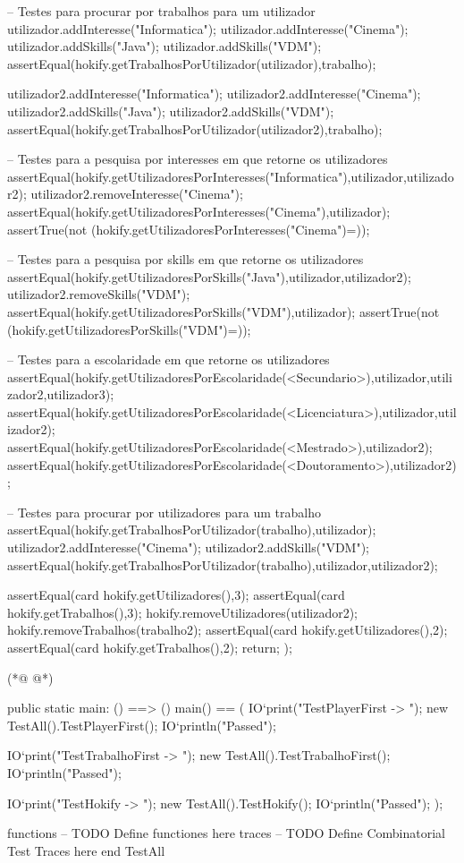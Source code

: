 \begin{vdmpp}[breaklines=true]
 -- Testes para procurar por trabalhos para um utilizador
 utilizador.addInteresse("Informatica");
 utilizador.addInteresse("Cinema");
 utilizador.addSkills("Java");
 utilizador.addSkills("VDM");
 assertEqual(hokify.getTrabalhosPorUtilizador(utilizador),{trabalho});
 
 utilizador2.addInteresse("Informatica");
 utilizador2.addInteresse("Cinema");
 utilizador2.addSkills("Java");
 utilizador2.addSkills("VDM");
 assertEqual(hokify.getTrabalhosPorUtilizador(utilizador2),{trabalho});
 
 -- Testes para a pesquisa por interesses em que retorne os utilizadores
 assertEqual(hokify.getUtilizadoresPorInteresses("Informatica"),{utilizador,utilizador2});
 utilizador2.removeInteresse("Cinema");
 assertEqual(hokify.getUtilizadoresPorInteresses("Cinema"),{utilizador});
 assertTrue(not (hokify.getUtilizadoresPorInteresses("Cinema")={}));
 
 -- Testes para a pesquisa por skills em que retorne os utilizadores
 assertEqual(hokify.getUtilizadoresPorSkills("Java"),{utilizador,utilizador2});
 utilizador2.removeSkills("VDM");
 assertEqual(hokify.getUtilizadoresPorSkills("VDM"),{utilizador});
 assertTrue(not (hokify.getUtilizadoresPorSkills("VDM")={}));
 
 -- Testes para a escolaridade em que retorne os utilizadores
 assertEqual(hokify.getUtilizadoresPorEscolaridade(<Secundario>),{utilizador,utilizador2,utilizador3});
 assertEqual(hokify.getUtilizadoresPorEscolaridade(<Licenciatura>),{utilizador,utilizador2});
 assertEqual(hokify.getUtilizadoresPorEscolaridade(<Mestrado>),{utilizador2});
 assertEqual(hokify.getUtilizadoresPorEscolaridade(<Doutoramento>),{utilizador2});
 
 -- Testes para procurar por utilizadores para um trabalho
 assertEqual(hokify.getTrabalhosPorUtilizador(trabalho),{utilizador});
 utilizador2.addInteresse("Cinema");
 utilizador2.addSkills("VDM");
 assertEqual(hokify.getTrabalhosPorUtilizador(trabalho),{utilizador,utilizador2});
 
 assertEqual(card hokify.getUtilizadores(),3);
 assertEqual(card hokify.getTrabalhos(),3);
 hokify.removeUtilizadores(utilizador2);
 hokify.removeTrabalhos(trabalho2);
 assertEqual(card hokify.getUtilizadores(),2);
 assertEqual(card hokify.getTrabalhos(),2);
 return;
);

(*@
\label{main:215}
@*)

public static main: () ==> ()
main() ==
(
 IO`print("TestPlayerFirst -> ");
 new TestAll().TestPlayerFirst();
 IO`println("Passed");
 
 IO`print("TestTrabalhoFirst -> ");
 new TestAll().TestTrabalhoFirst();
 IO`println("Passed");
 
 IO`print("TestHokify -> ");
 new TestAll().TestHokify();
 IO`println("Passed");
);

functions
-- TODO Define functiones here
traces
-- TODO Define Combinatorial Test Traces here
end TestAll
\end{vdmpp}
